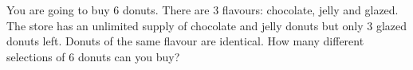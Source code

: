 You are going to buy $6$ donuts. There are $3$ flavours: chocolate, jelly and glazed. The store has an unlimited supply of chocolate and jelly donuts but only $3$ glazed donuts left. Donuts of the same flavour are identical. How many different selections of $6$ donuts can you buy?
